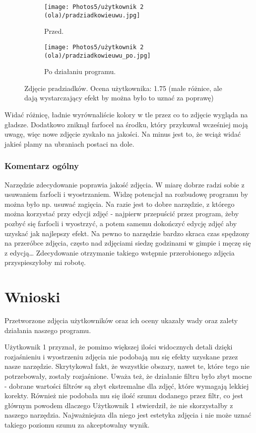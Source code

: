 \documentclass[]{mwart}
\begin{document}
\begin{figure}[h!]
    \centering
    \begin{subfigure}[b]{0.49\textwidth}
        \centering
        \texttt{[image: Photos5/użytkownik 2 (ola)/pradziadkowieuwu.jpg]}
        \caption{Przed.}
    \end{subfigure}
    \hfill
    \begin{subfigure}[b]{0.49\textwidth}
        \centering
        \texttt{[image: Photos5/użytkownik 2 (ola)/pradziadkowieuwu\_po.jpg]}
        \caption{Po działaniu programu.}
    \end{subfigure}
    \caption{Zdjęcie pradziadków. Ocena użytkownika: 1.75  (małe różnice, ale dają wystarczający efekt by można było to uznać za poprawę) }
\end{figure}
Widać różnicę, ładnie wyrównaliście kolory w tle przez co to zdjęcie wygląda na gładsze. Dodatkowo zniknął farfocel na środku, który przykuwał wcześniej moją uwagę, więc nowe zdjęcie zyskało na jakości. Na minus jest to, że wciąż widać jakieś plamy na ubraniach postaci na dole.




\subsubsection{Komentarz ogólny}
Narzędzie zdecydowanie poprawia jakość zdjęcia. W miarę dobrze radzi sobie z usuwaniem farfocli i wyostrzaniem. Widzę potencjał na rozbudowę programu by można było np. usuwać zagięcia. Na razie jest to dobre narzędzie, z którego można korzystać przy edycji zdjęć - najpierw przepuścić przez program, żeby pozbyć się farfocli i wyostrzyć, a potem samemu dokończyć edycję zdjęć aby uzyskać jak najlepszy efekt. Na pewno to narzędzie bardzo skraca czas spędzony na przeróbce zdjęcia, często nad zdjęciami siedzę godzinami w gimpie i męczę się z edycją… Zdecydowanie otrzymanie takiego wstępnie przerobionego zdjęcia przyspieszyłoby mi robotę.



\newpage
\section{Wnioski}
Przetworzone zdjęcia użytkowników oraz ich oceny ukazały wady oraz zalety działania naszego programu.\newline

Użytkownik 1 przyznał, że pomimo większej ilości widocznych detali dzięki rozjaśnieniu i wyostrzeniu zdjęcia nie podobają mu się efekty uzyskane przez nasze narzędzie. Skrytykował fakt, że wszystkie obszary, nawet te, które tego nie potrzebowały, zostały rozjaśnione. Uważa też, że działanie filtru było zbyt mocne - dobrane wartości filtrów są zbyt ekstremalne dla zdjęć, które wymagają lekkiej korekty. Również nie podobała mu się ilość szumu dodanego przez filtr, co jest głównym powodem dlaczego Użytkownik 1 stwierdził, że nie skorzystałby z naszego narzędzia. Najważniejsza dla niego jest estetyka zdjęcia i nie może uznać takiego poziomu szumu za akceptowalny wynik. \newline
\end{document}
